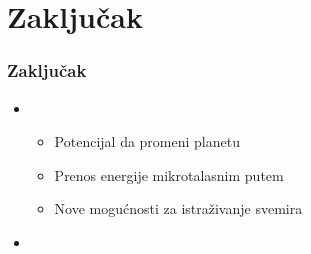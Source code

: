 \documentclass[11pt]{beamer}
\begin{document}
\section{Zaključak}

\begin{frame}\frametitle{Zaključak}
	\begin{itemize}	
		\item 
		\begin{itemize}
			\item Potencijal da promeni planetu
			\item Prenos energije mikrotalasnim putem
			\item Nove mogućnosti za istraživanje svemira
		\end{itemize}
		\item 
	\end{itemize}
\end{frame}
\end{document}
